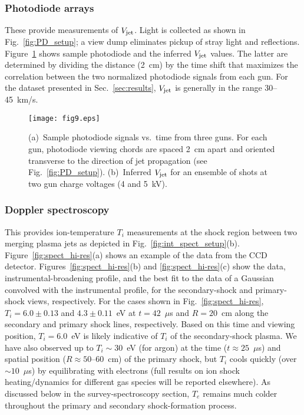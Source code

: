 \documentclass[journal]{IEEEtran}
\begin{document}
\subsubsection{Photodiode arrays}
These provide measurements of $V_{\rm jet}$.
Light is collected as shown in Fig.~\ref{fig:PD_setup}; a view dump eliminates pickup of stray light and 
reflections.  Figure~\ref{fig:PD} shows
sample photodiode and the inferred $V_{\rm jet}$ values.  The latter
are determined by dividing the distance (2~cm) by the time shift that maximizes the correlation between 
the two normalized photodiode signals from each gun.  For the dataset presented in
Sec.~\ref{sec:results}, $V_{\rm jet}$ is generally in the range 30--45~km/s.

\begin{figure*}[!tb]
\centering
\texttt{[image: fig9.eps]}
\caption{(a)~Sample photodiode signals vs.\ time from three guns.  For each gun, photodiode viewing
chords are spaced 2~cm apart and oriented transverse to the direction of jet propagation
(see Fig.~\ref{fig:PD_setup}).
(b)~Inferred $V_{\rm jet}$ for an ensemble of shots at two gun charge voltages (4 and 5~kV).}
\label{fig:PD}
\end{figure*}

\subsubsection{Doppler spectroscopy}
This provides ion-temperature $T_i$ measurements at the shock region
between two merging plasma jets as depicted in Fig.~\ref{fig:int_spect_setup}(b).
Figure~\ref{fig:spect_hi-res}(a) shows an example of the data from the CCD detector.
Figures~\ref{fig:spect_hi-res}(b) and \ref{fig:spect_hi-res}(c) show the data, instrumental-broadening
profile, and the best fit to the data of a Gaussian convolved with the instrumental profile, for
the secondary-shock and primary-shock views, respectively.  For the cases shown
in Fig.~\ref{fig:spect_hi-res}, $T_i = 6.0 \pm 0.13$ and $4.3\pm 0.11$~eV
at $t=42$~$\mu$s and $R=20$~cm along
the secondary and primary shock lines, respectively.  Based on this time and viewing position,
$T_i=6.0$~eV is likely indicative of $T_i$ of the secondary-shock plasma.
We have also observed up to $T_i \sim 30$~eV (for argon) at the time ($t\approx 25$~$\mu$s)
and spatial position ($R\approx 50$--60~cm) of the primary shock,
but $T_i$ cools quickly (over $\sim 
10$~$\mu$s) by equilibrating with electrons (full results on ion shock heating/dynamics
for different gas species
will be reported elsewhere).  As discussed below in the survey-spectroscopy section, 
$T_e$ remains much colder throughout the primary and secondary shock-formation process.
\end{document}
